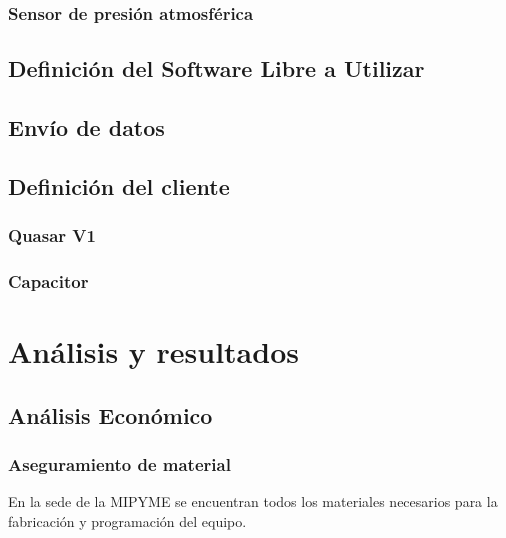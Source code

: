 \documentclass[12pt,letterpaper]{article}
\begin{document}
\begin{sloppypar}
        \subsubsection{Sensor de presión atmosférica}

        \subsection{Definición del Software Libre a Utilizar}

        \subsection{Envío de datos}

        \subsection{Definición del cliente}

        \subsubsection{Quasar V1}

        \subsubsection{Capacitor}

        \newpage


        \section{Análisis y resultados}

        \subsection{Análisis Económico}\label{sec:factibilidad-del-proyecto}

        \subsubsection{Aseguramiento de
        material}\label{subsec:aseguramiento-de-material}
        En la sede de la MIPYME \espoleta se encuentran todos los materiales
        necesarios
        para la fabricación y programación del equipo.


\end{sloppypar}
\end{document}
